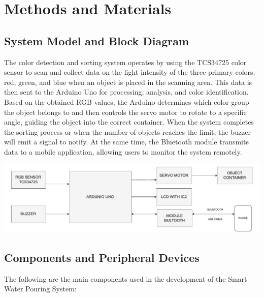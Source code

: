 \documentclass[conference, onecolumn]{IEEEtran}
\begin{document}
\vspace{4em}

\section{Methods and Materials}

\subsection{System Model and Block Diagram}
The color detection and sorting system operates by using the TCS34725 color sensor to scan and collect data on the light intensity of the three primary colors: red, green, and blue when an object is placed in the scanning area. This data is then sent to the Arduino Uno for processing, analysis, and color identification. Based on the obtained RGB values, the Arduino determines which color group the object belongs to and then controls the servo motor to rotate to a specific angle, guiding the object into the correct container. When the system completes the sorting process or when the number of objects reaches the limit, the buzzer will emit a signal to notify. At the same time, the Bluetooth module transmits data to a mobile application, allowing users to monitor the system remotely.


   
     \begin{center}
    \includegraphics[width=1\textwidth]{IOT-Color-Based Object Sorting Machine/Block_Diagram.pdf}
    \label{fig1}
    \end{center}
\vspace{1em}
\clearpage
\subsection{Components and Peripheral Devices}
The following are the main components used in the development of the Smart Water Pouring System:
\end{document}
